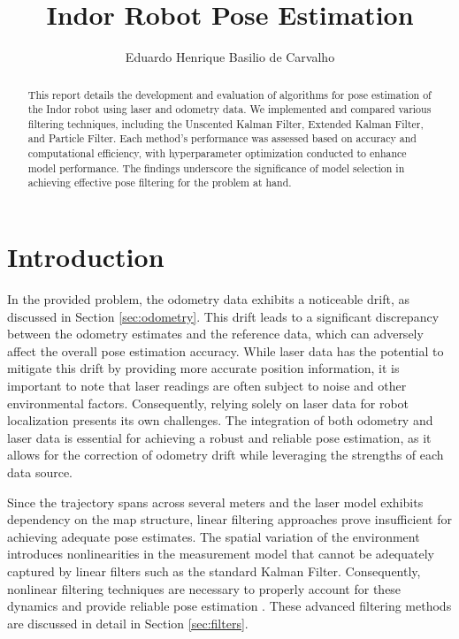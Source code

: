 \documentclass[conference]{IEEEtran}
\begin{document}
\title{
    Indor Robot Pose Estimation
}

\author{
    Eduardo Henrique Basilio de Carvalho
}

\maketitle

\begin{abstract}
    This report details the development and evaluation of algorithms for pose estimation of the Indor robot using laser and odometry data. We implemented and compared various filtering techniques, including the Unscented Kalman Filter, Extended Kalman Filter, and Particle Filter. Each method's performance was assessed based on accuracy and computational efficiency, with hyperparameter optimization conducted to enhance model performance. The findings underscore the significance of model selection in achieving effective pose filtering for the problem at hand.
\end{abstract}

\section{Introduction} \label{sec:introduction}

In the provided problem, the odometry data exhibits a noticeable drift, as discussed in Section \ref{sec:odometry}. This drift leads to a significant discrepancy between the odometry estimates and the reference data, which can adversely affect the overall pose estimation accuracy. While laser data has the potential to mitigate this drift by providing more accurate position information, it is important to note that laser readings are often subject to noise and other environmental factors. Consequently, relying solely on laser data for robot localization presents its own challenges. The integration of both odometry and laser data is essential for achieving a robust and reliable pose estimation, as it allows for the correction of odometry drift while leveraging the strengths of each data source.

Since the trajectory spans across several meters and the laser model exhibits dependency on the map structure, linear filtering approaches prove insufficient for achieving adequate pose estimates. The spatial variation of the environment introduces nonlinearities in the measurement model that cannot be adequately captured by linear filters such as the standard Kalman Filter. Consequently, nonlinear filtering techniques are necessary to properly account for these dynamics and provide reliable pose estimation \cite{Aguirre2007}. These advanced filtering methods are discussed in detail in Section \ref{sec:filters}.
\end{document}
